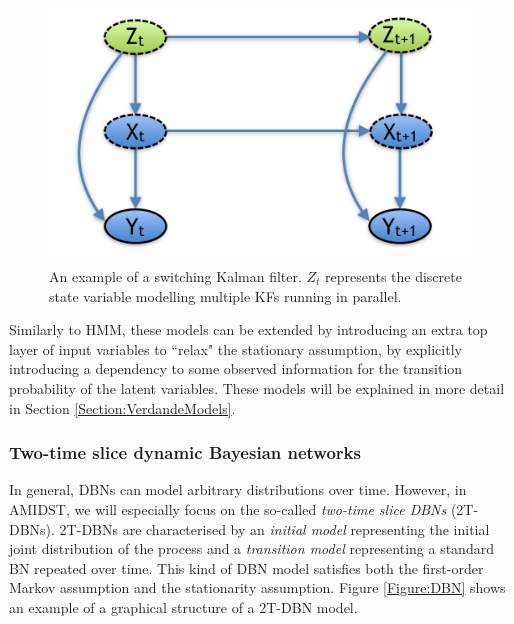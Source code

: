 \begin{figure}[ht!]
\begin{center}
\includegraphics[scale=0.4]{./figures/PreliminariesSKF}
\caption{\label{Figure:SKF} An example of a switching Kalman filter. $Z_t$ represents the discrete state variable modelling multiple KFs running in parallel.}
\end{center}
\end{figure}

Similarly to HMM, these models can be extended by introducing an extra top layer of input variables to ``relax" the stationary assumption, by explicitly introducing a dependency to some observed information for the transition probability of the latent variables. These models will be explained in more detail in Section \ref{Section:VerdandeModels}.

\subsubsection{Two-time slice dynamic Bayesian networks}\label{SubSubSection:2DBNs}	

In general, DBNs can model arbitrary distributions over time. However, in AMIDST,  we will especially focus on the so-called \textit{two-time slice DBNs} (2T-DBNs). 2T-DBNs are characterised by an \textit{initial model} representing the initial joint distribution of the process and a \textit{transition model} representing a standard BN repeated over time. This kind of DBN model satisfies both the first-order Markov assumption and the stationarity assumption. Figure \ref{Figure:DBN} shows an example of a graphical structure of a 2T-DBN model. 

